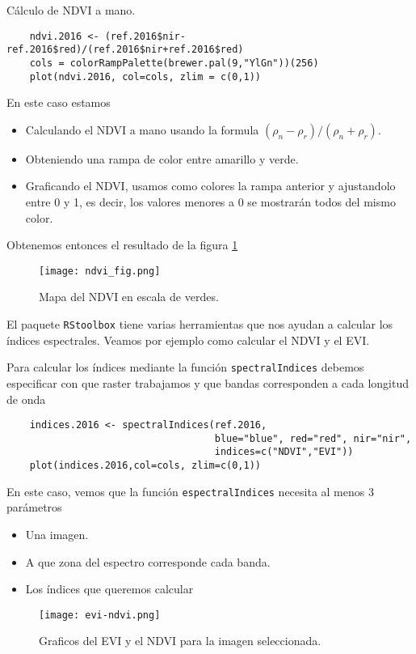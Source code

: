 \begin{exa}
    C\'alculo de NDVI a mano.
    \begin{lstlisting}
    ndvi.2016 <- (ref.2016$nir-ref.2016$red)/(ref.2016$nir+ref.2016$red)
    cols = colorRampPalette(brewer.pal(9,"YlGn"))(256)
    plot(ndvi.2016, col=cols, zlim = c(0,1))
    \end{lstlisting}
    En este caso estamos
    \begin{itemize}
        \item Calculando el NDVI a mano usando la formula $(\rho_n-\rho_r)/(\rho_n+\rho_r)$.
        \item Obteniendo una rampa de color entre amarillo y verde.
        \item Graficando el NDVI, usamos como colores la rampa anterior
            y ajustandolo entre 0 y 1, es decir, los valores menores a 0 se
            mostrar\'an todos del mismo color.
    \end{itemize}
    Obtenemos entonces el resultado de la figura \ref{fig:ndvifig}
    \begin{figure}[h!]
    \begin{center}
        \texttt{[image: ndvi\_fig.png]}
    \end{center}
    \caption{Mapa del NDVI en escala de verdes.}
    \label{fig:ndvifig}
    \end{figure}

\end{exa}

El paquete \texttt{RStoolbox} tiene varias herramientas que nos ayudan a
calcular los \'indices espectrales. Veamos por ejemplo como calcular el NDVI y el
EVI.

\begin{exa}
    Para calcular los \'indices mediante la funci\'on \texttt{spectralIndices} debemos
    especificar con que raster trabajamos y que bandas corresponden a cada
    longitud de onda
    \begin{lstlisting}
    indices.2016 <- spectralIndices(ref.2016,
                                    blue="blue", red="red", nir="nir",
                                    indices=c("NDVI","EVI"))
    plot(indices.2016,col=cols, zlim=c(0,1))
    \end{lstlisting}
    En este caso, vemos que la funci\'on \texttt{espectralIndices} necesita al
    menos 3 par\'ametros
    \begin{itemize}
        \item Una imagen.
        \item A que zona del espectro corresponde cada banda.
        \item Los \'indices que queremos calcular
    \end{itemize}
     \begin{figure}[h!]
     \begin{center}
         \texttt{[image: evi-ndvi.png]}
     \end{center}
     \caption{Graficos del EVI y el NDVI para la imagen seleccionada.}
     \label{fig:evi-ndvi}
     \end{figure}

\end{exa}

